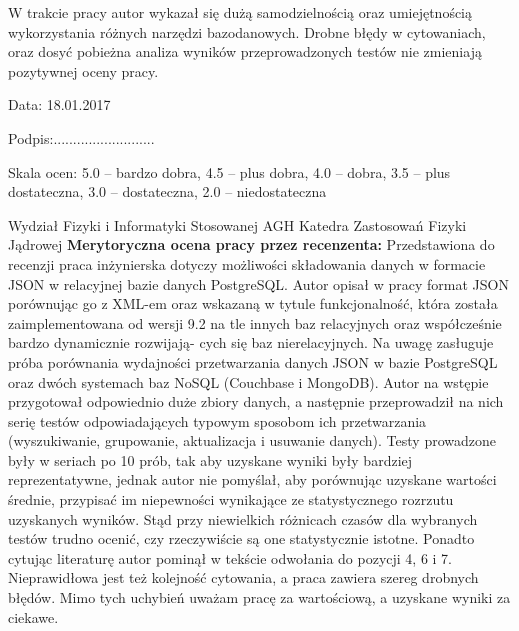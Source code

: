 \documentclass[a4paper,12pt,table]{article}
\begin{document}
W trakcie pracy autor wykazał się dużą samodzielnością oraz umiejętnością wykorzystania
różnych narzędzi bazodanowych. Drobne błędy w cytowaniach, oraz dosyć pobieżna analiza
wyników przeprowadzonych testów nie zmieniają pozytywnej oceny pracy.



\vspace*{0.15cm}
\begin{minipage}{0.5\textwidth}
\begin{center}
Data: 18.01.2017
\end{center}

\end{minipage}
\begin{minipage}{0.5\textwidth}
\begin{center}
Podpis:{\large ..........................}
\end{center}

\end{minipage}\newline

\vspace*{0.35cm}
 
 
{\scriptsize Skala ocen: 5.0 – bardzo dobra, 4.5 – plus dobra, 4.0 – dobra, 3.5 – plus dostateczna, 3.0 – dostateczna, 2.0 – niedostateczna}

\newpage
{}\newline
Wydział Fizyki i Informatyki Stosowanej AGH\newline
Katedra Zastosowań Fizyki Jądrowej
\vspace{1cm}
\newline
\textbf{Merytoryczna ocena pracy przez recenzenta:}
\vspace*{0.5cm}\newline
\indent Przedstawiona do recenzji praca inżynierska dotyczy możliwości składowania danych w formacie
JSON w relacyjnej bazie danych PostgreSQL. Autor opisał w pracy format JSON porównując
go z XML-em oraz wskazaną w tytule funkcjonalność, która została zaimplementowana
od wersji 9.2 na tle innych baz relacyjnych oraz współcześnie bardzo dynamicznie rozwijają-
cych się baz nierelacyjnych. Na uwagę zasługuje próba porównania wydajności przetwarzania
danych JSON w bazie PostgreSQL oraz dwóch systemach baz NoSQL (Couchbase i MongoDB).
Autor na wstępie przygotował odpowiednio duże zbiory danych, a następnie przeprowadził na
nich serię testów odpowiadających typowym sposobom ich przetwarzania (wyszukiwanie, grupowanie,
aktualizacja i usuwanie danych). Testy prowadzone były w seriach po 10 prób, tak
aby uzyskane wyniki były bardziej reprezentatywne, jednak autor nie pomyślał, aby porównując
uzyskane wartości średnie, przypisać im niepewności wynikające ze statystycznego rozrzutu
uzyskanych wyników. Stąd przy niewielkich różnicach czasów dla wybranych testów trudno
ocenić, czy rzeczywiście są one statystycznie istotne. Ponadto cytując literaturę autor pominął
w tekście odwołania do pozycji 4, 6 i 7. Nieprawidłowa jest też kolejność cytowania, a praca zawiera
szereg drobnych błędów. Mimo tych uchybień uważam pracę za wartościową, a uzyskane
wyniki za ciekawe.
\end{document}
